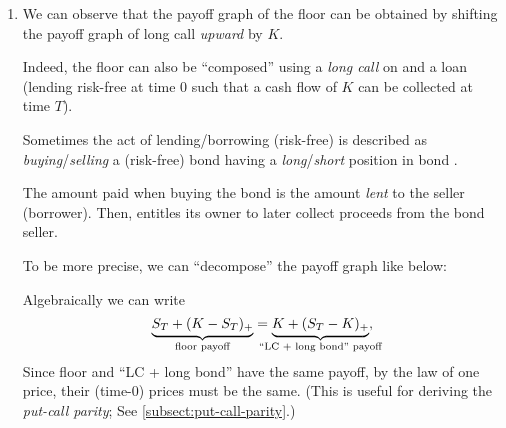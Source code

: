 \begin{enumerate}
\item We can observe that the payoff graph of the floor can be obtained by
shifting the payoff graph of long call \emph{upward} by \(K\).

Indeed, the floor can also be ``composed'' using a \emph{long call} on
 and a loan (lending  risk-free at time
0 such that a cash flow of \(K\) can be collected at time \(T\)).

\begin{note}
Sometimes the act of lending/borrowing  (risk-free) is
described as \emph{buying}/\emph{selling} a (risk-free) bond 
 having a \emph{long}/\emph{short} position in bond
.

The amount paid when buying the bond  is the amount \emph{lent}
to the seller (borrower). Then,  entitles its owner to later
collect proceeds from the bond seller.
\end{note}

To be more precise, we can ``decompose'' the payoff graph like below:

\begin{center}
\end{center}
Algebraically we can write
\[
\underbrace{S_T+(K-S_T)_{+}}_{\text{floor payoff}}
=\underbrace{K+(S_T-K)_{+}}_{\mathclap{\text{``LC + long bond'' payoff}}},
\]
Since floor and ``LC + long bond'' have the same payoff, by the law of one
price, their (time-0) prices must be the same. (This is useful for deriving the
\emph{put-call parity}; See \cref{subsect:put-call-parity}.)
\end{enumerate}
